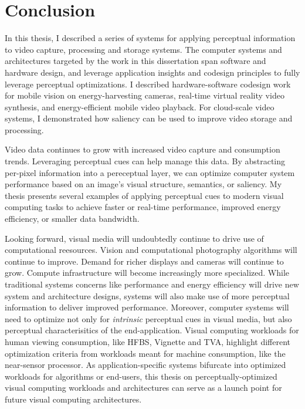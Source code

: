 \chapter{Conclusion}
\label{ch:concl}

In this thesis, I described a series of systems for applying perceptual information to video capture, processing and storage systems.
The computer systems and architectures targeted by the work in this dissertation span software and hardware design, and leverage application insights and codesign principles to fully leverage perceptual optimizations.
I described hardware-software codesign work for mobile vision on energy-harvesting cameras, real-time virtual reality video synthesis, and energy-efficient mobile video playback.
For cloud-scale video systems, I demonstrated how saliency can be used to improve video storage and processing.

Video data continues to grow with increased video capture and consumption trends. Leveraging perceptual cues can help manage this data.
By abstracting per-pixel information into a pereceptual layer, we can optimize computer system performance based on an image's visual structure, semantics, or saliency.
My thesis presents several examples of applying perceptual cues to modern visual computing tasks to achieve faster or real-time performance, improved energy efficiency, or smaller data bandwidth.

Looking forward, visual media will undoubtedly continue to drive use of computational reesources.
Vision and computational photography algorithms will continue to improve.
Demand for richer displays and cameras will continue to grow.
Compute infrastructure will become increasingly more specialized.
While traditional systems concerns like performance and energy efficiency will drive new system and architecture designs, systems will also make use of more perceptual information to deliver improved performance.
Moreover, computer systems will need to optimize not only for \emph{intrinsic} perceptual cues in visual media, but also perceptual characterisitics of the end-application.
Visual computing workloads for human viewing consumption, like HFBS, Vignette and TVA, highlight different optimization criteria from workloads meant for machine consumption, like the near-sensor processor.
As application-specific systems bifurcate into optimized workloads for algorithms or end-users, this thesis on perceptually-optimized visual computing workloads and architectures can serve as a launch point for future visual computing architectures.
